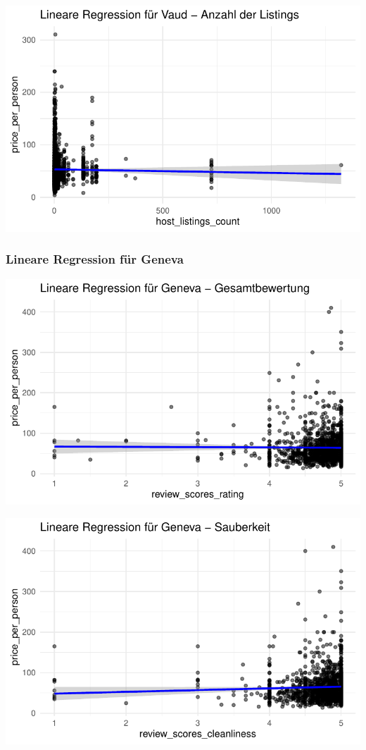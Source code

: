 \documentclass[
  journal,
]{IEEEtran}%
\begin{document}
\includegraphics{main_files/figure-pdf/unnamed-chunk-17-6.pdf}

\subsubsection{Lineare Regression für
Geneva}\label{lineare-regression-fuxfcr-geneva}

\includegraphics{main_files/figure-pdf/unnamed-chunk-18-1.pdf}

\includegraphics{main_files/figure-pdf/unnamed-chunk-18-2.pdf}
\end{document}

